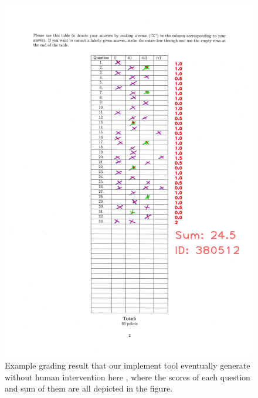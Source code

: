 \documentclass[a4paper,twoside]{article}
\begin{document}
 \begin{figure}[!h]
  \centering
  \includegraphics[width=\columnwidth]{Latex/imgs/380512.png}
  \caption{Example grading result that our implement tool eventually generate without human intervention here , where the scores of each question and sum of them are all depicted in the figure.}
  \label{fig:eventual_result}
 \end{figure}
 
 
 
\end{document}
